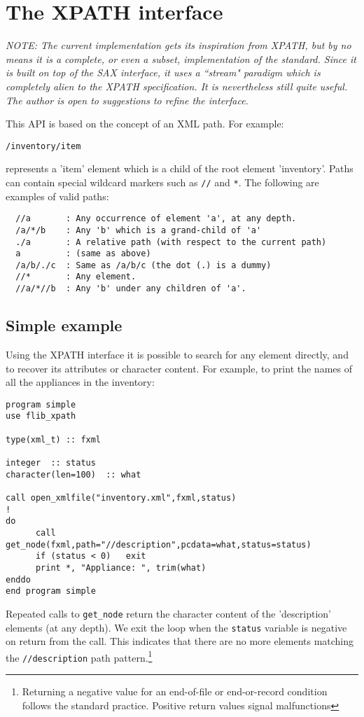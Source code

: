 \documentclass[11pt]{article}
\begin{document}
\section{The XPATH interface}

\textsl{NOTE: The current implementation gets its inspiration from
XPATH, but by no means it is a complete, or even a subset,
implementation of the standard. Since it is built on top of the SAX
interface, it uses a ``stream" paradigm which is completely alien to
the XPATH specification. It is nevertheless still quite useful. The
author is open to suggestions to refine the interface.}

\bigskip

This API is based on the concept of an XML path. For example:
%
\begin{verbatim}
/inventory/item
\end{verbatim}
%
represents a 'item' element which is a child of the root element
'inventory'. Paths can contain special wildcard markers such as
\texttt{//} and \texttt{*}. The following are examples of valid paths:
%
\begin{verbatim}
  //a       : Any occurrence of element 'a', at any depth.
  /a/*/b    : Any 'b' which is a grand-child of 'a'
  ./a       : A relative path (with respect to the current path)
  a         : (same as above)
  /a/b/./c  : Same as /a/b/c (the dot (.) is a dummy)
  //*       : Any element.
  //a/*//b  : Any 'b' under any children of 'a'.

\end{verbatim}
%
\subsection{Simple example}
Using the XPATH interface it is possible to search for any element
directly, and to recover its attributes or character content. For
example, to print the names of all the appliances in the inventory:
%
\begin{verbatim}
program simple
use flib_xpath

type(xml_t) :: fxml

integer  :: status
character(len=100)  :: what

call open_xmlfile("inventory.xml",fxml,status)
!
do
      call get_node(fxml,path="//description",pcdata=what,status=status)
      if (status < 0)   exit
      print *, "Appliance: ", trim(what)
enddo
end program simple
\end{verbatim}
%
Repeated calls to \texttt{get\_node} return the character content of
the 'description' elements (at any depth). We exit the loop when the
\texttt{status} variable is negative on return from the call. This
indicates that there are no more elements matching the
\texttt{//description} path pattern.\footnote{Returning a negative
value for an end-of-file or end-or-record condition follows the
standard practice. Positive return values signal malfunctions}
\end{document}
